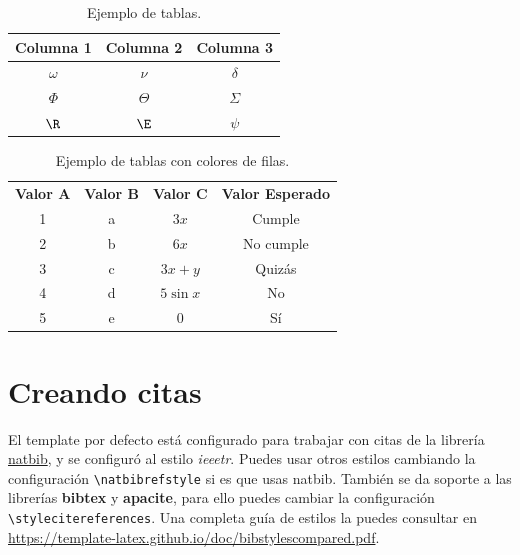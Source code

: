 \begin{table}[H] %
	\centering
	\caption{Ejemplo de tablas.}
	\begin{tabular}{ccc}
		\hline
		\textbf{Columna 1} & \textbf{Columna 2} & \textbf{Columna 3} \bigstrut\\
		\hline
		$\omega$ & $\nu$ & $\delta$ \bigstrut[t]\\
		$\Phi$ & $\Theta$ & $\varSigma$ \\
		$\R$ & $\E$ & $\psi$ \\
		\hline
	\end{tabular}
	\label{tab:tabla-1}
\end{table}

\enabletablerowcolor
\begin{table}[H]
	\centering
	\caption{Ejemplo de tablas con colores de filas.}
	\begin{tabular}{ccccc}
		\rowcolor[rgb]{ .749,  .749,  .749} \textbf{Valor A} & \textbf{Valor B} & \textbf{Valor C} & \multicolumn{2}{c}{\textbf{Valor Esperado}} \\
		1     & a     & $3x$  & \multicolumn{2}{c}{Cumple} \\
		2     & b     & $6x$  & \multicolumn{2}{c}{No cumple} \\
		3     & c     & $3x+y$ & \multicolumn{2}{c}{Quizás} \\
		4     & d     & $5\sin x$ & \multicolumn{2}{c}{No} \\
		5     & e     & $0$ & \multicolumn{2}{c}{Sí} \\
	\end{tabular}
\end{table}
\disabletablerowcolor
	
\section{Creando citas}

El template por defecto está configurado para trabajar con citas de la librería \href{https://www.ctan.org/pkg/natbib}{natbib}, y se configuró al estilo \textit{ieeetr}. Puedes usar otros estilos cambiando la configuración \texttt{\textbackslash natbibrefstyle} si es que usas natbib. También se da soporte a las librerías \textbf{bibtex} y \textbf{apacite}, para ello puedes cambiar la configuración \texttt{\textbackslash stylecitereferences}. Una completa guía de estilos la puedes consultar en \url{https://template-latex.github.io/doc/bibstylescompared.pdf}. \\

